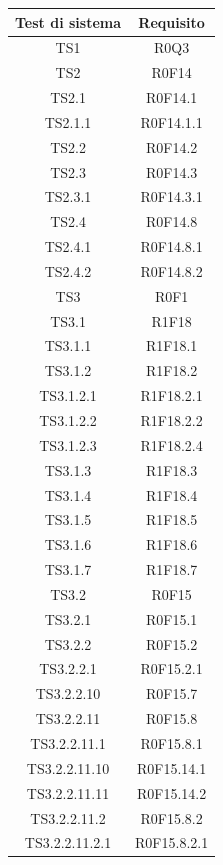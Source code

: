 \documentclass[../PianoDiQualifica.tex]{subfiles}
\begin{document}
	\begin{longtable}{|c|c|}
		\hline
		\textbf{Test di sistema} & \textbf{Requisito}\\
		\hline
		\endhead
		TS1 & R0Q3  \\
		\hline
		TS2 & R0F14  \\
		\hline
		TS2.1 & R0F14.1   \\
		\hline
		TS2.1.1 & R0F14.1.1   \\
		\hline
		TS2.2 & R0F14.2   \\
		\hline
		TS2.3 & R0F14.3   \\
		\hline
		TS2.3.1 & R0F14.3.1   \\
		\hline
		TS2.4 & R0F14.8   \\
		\hline
		TS2.4.1 & R0F14.8.1   \\
		\hline
		TS2.4.2 & R0F14.8.2   \\
		\hline
		TS3 & R0F1   \\
		\hline
		TS3.1 & R1F18   \\
		\hline
		TS3.1.1 & R1F18.1   \\
		\hline
		TS3.1.2 & R1F18.2   \\
		\hline
		TS3.1.2.1 & R1F18.2.1   \\
		\hline
		TS3.1.2.2 & R1F18.2.2   \\
		\hline
		TS3.1.2.3 & R1F18.2.4   \\
		\hline
		TS3.1.3 & R1F18.3   \\
		\hline
		TS3.1.4 & R1F18.4   \\
		\hline
		TS3.1.5 & R1F18.5   \\
		\hline
		TS3.1.6 & R1F18.6   \\
		\hline
		TS3.1.7 & R1F18.7   \\
		\hline
		TS3.2 & R0F15   \\
		\hline
		TS3.2.1 & R0F15.1   \\
		\hline
		TS3.2.2 & R0F15.2   \\
		\hline
		TS3.2.2.1 & R0F15.2.1   \\
		\hline
		TS3.2.2.10 & R0F15.7   \\
		\hline
		TS3.2.2.11 & R0F15.8   \\
		\hline
		TS3.2.2.11.1 & R0F15.8.1   \\
		\hline
		TS3.2.2.11.10 & R0F15.14.1   \\
		\hline
		TS3.2.2.11.11 & R0F15.14.2   \\
		\hline
		TS3.2.2.11.2 & R0F15.8.2   \\
		\hline
		TS3.2.2.11.2.1 & R0F15.8.2.1   \\

\end{longtable}
\end{document}

